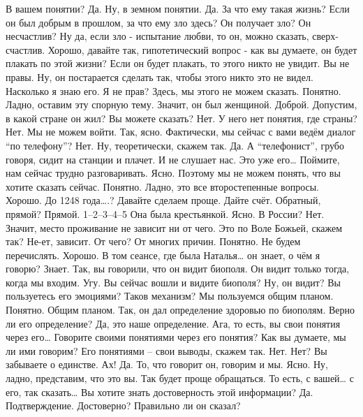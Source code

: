 \documentclass{extbook}
\newcommand{\soul}[1]{{#1}}
\newcommand{\people}[1]{{#1}}
\begin{document}
\soul{В вашем понятии?}
\people{Да. Ну, в земном понятии. }
\soul{Да.}
\people{За что ему такая жизнь? Если он был добрым в прошлом, за что ему зло здесь?}
\soul{Он получает зло? Он несчастлив? }
\people{Ну да, если зло - испытание любви, то  он, можно сказать, сверх-счастлив.}
\soul{Хорошо, давайте так, гипотетический вопрос - как вы думаете, он будет плакать по  этой жизни?}
\people{Если он будет плакать, то этого никто не увидит.}
\soul{Вы не правы.}
\people{Ну, он постарается сделать так, чтобы  этого никто это не видел. Насколько я  знаю его. Я не прав?}
\soul{Здесь, мы этого не можем сказать.}
\people{Понятно. Ладно, оставим эту  спорную тему.  Значит, он был женщиной.  Доброй.  Допустим, в какой стране он жил? Вы можете сказать?}
\soul{Нет.}
\people{У него  нет понятия, где страны?}
\soul{Нет. Мы не можем войти.}
\people{Так, ясно. Фактически, мы сейчас с вами ведём диалог ``по телефону''? }
\soul{Нет.}
\people{Ну, теоретически, скажем так. }
\soul{Да.}
\people{А ``телефонист'', грубо говоря,  сидит на станции и плачет. И  не слушает нас.}
\soul{Это уже его… Поймите,  нам сейчас трудно разговаривать.}
\people{Ясно.}
\soul{Поэтому мы не можем понять, что вы хотите сказать сейчас.}
\people{Понятно. Ладно, это все второстепенные вопросы. Хорошо. До 1248 года….?}
\soul{Давайте сделаем  проще. Дайте счёт. }
\people{Обратный, прямой? }
\soul{Прямой.}
\people{1–2–3–4–5}
\soul{Она была крестьянкой.}
\people{Ясно. В России?}
\soul{Нет.}
\people{Значит, место проживание не зависит ни от чего.  Это по Воле Божьей, скажем так?}
\soul{Не-ет, зависит. }
\people{От чего?}
\soul{От многих причин.}
\people{Понятно. Не будем перечислять. Хорошо.  В том сеансе, где была Наталья… он  знает, о чём я говорю? Знает. Так, вы говорили, что он видит биополя.}
\soul{Он видит только тогда, когда мы входим.}
\people{Угу. Вы сейчас вошли и видите биополя? Ну, он видит? Вы пользуетесь его эмоциями? Таков механизм?}
\soul{Мы пользуемся общим планом.}
\people{Понятно. Общим планом. Так, он дал определение здоровью по  биополям. Верно ли его определение? }
\soul{Да, это наше определение.}
\people{Ага, то есть, вы свои понятия через его… Говорите своими понятиями через его понятия?}
\soul{Как вы думаете, мы ли ими говорим?}
\people{Его понятиями – свои выводы, скажем так.}
\soul{Нет.}
\people{Нет?}
\soul{Вы забываете о единстве.}
\people{Ах! Да.}
\soul{То, что говорит он, говорим и мы.}
\people{Ясно. Ну, ладно, представим, что это вы. Так будет проще обращаться. То есть, с вашей… с  его, так сказать…}
\soul{Вы хотите знать достоверность этой информации?}
\people{Да. Подтверждение. Достоверно? Правильно ли он сказал?}
\end{document}
